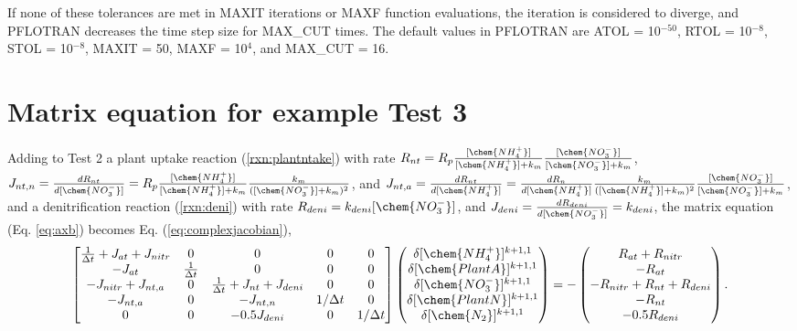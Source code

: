 \documentclass[gmd, manuscript]{copernicus}
\begin{document}
If none of these tolerances are met in MAXIT iterations or MAXF function
evaluations, the iteration is considered to diverge, and PFLOTRAN decreases the
time step size for MAX\_CUT times. The default values in PFLOTRAN are ATOL =
10$^{-50}$, RTOL = 10$^{-8}$, STOL = 10$^{-8}$,  %
MAXIT = 50, MAXF = 10$^4$, and MAX\_CUT = 16.

\section{Matrix equation for example Test 3}
\label{sec:eqtest3}
Adding to Test 2 a plant  uptake reaction (\ref{rxn:plantntake}) with rate
$R_{nt}=R_p\frac{[\chem{NH_4^+}]}{[\chem{NH_4^+}] +
k_m}\frac{[\chem{NO_3^-}]}{[\chem{NO_3^-}] + k_m}$, $J_{nt,n}
=\frac{dR_{nt}}{d[\chem{NO_3^-}]}=R_p\frac{[\chem{NH_4^+}]}{[\chem{NH_4^+}] +
k_m}\frac{k_m}{([\chem{NO_3^-}] + k_m)^2}$, and $J_{nt,a} =
\frac{dR_{nt}}{d[\chem{NH_4^+}]}=\frac{dR_n}{d[\chem{NH_4^+}]}
\frac{k_m}{([\chem{NH_4^+}] + k_m)^2}\frac{[\chem{NO_3^-}]}{[\chem{NO_3^-}] +
k_m}$, and a denitrification reaction
(\ref{rxn:deni}) with rate $R_{deni}=k_{deni} [\chem{NO_3^-}]$, and $J_{deni} =
\frac{dR_{deni}}{d[\chem{NO_3^-}]}=k_{deni}$, the matrix equation (Eq. \ref{eq:axb}) becomes  
Eq. (\ref{eq:complexjacobian}),
\begin{equation}
\label{eq:complexjacobian}
\left[
\begin{matrix}
\frac{1}{\Delta t} + J_{at} + J_{nitr} & 0                  & 0                                   &0 & 0\\
-J_{at}                              & \frac{1}{\Delta t} & 0 &0 &0\\
-J_{nitr} + J_{nt,a}                 & 0                  & \frac{1}{\Delta t} + J_{nt} + J_{deni}&0 &0 \\
-J_{nt,a}                            & 0                  & -J_{nt,n}                             &1/\Delta t & 0 \\
 0                                   & 0                  & -0.5J_{deni}                             & 0 &1/\Delta t
\end{matrix}
\right]
\left(
\begin{matrix}
\delta [\chem{NH_4^+}]^{k+1,1} \\
\delta [\chem{PlantA}]^{k+1,1} \\
\delta [\chem{NO_3^-}]^{k+1,1} \\ 
\delta [\chem{PlantN}]^{k+1,1} \\
\delta [\chem{N_2}]^{k+1,1} 
\end{matrix}
\right)
=-
\left(
\begin{matrix}
R_{at} + R_{nitr} \\
-R_{at} \\
-R_{nitr} + R_{nt} + R_{deni} \\
-R_{nt} \\
-0.5R_{deni}
\end{matrix}
\right).
\end{equation}


\end{document}
